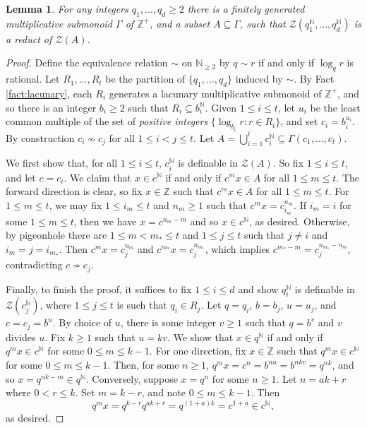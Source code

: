 \documentclass{amsart}
\def\seq{\subseteq}
\newcommand{\cZ}{\mathcal{Z}}
\def\N{\mathbb N}
\def\Z{\mathbb Z}
\newtheorem{lemma}[theorem]{Lemma}
\theoremstyle{definition}
\begin{document}
\begin{lemma}\label{lem:unary}
For any integers $q_1,\ldots,q_d\geq 2$ there is a finitely generated multiplicative submonoid $\Gamma$ of $\Z^+$, and a subset $A\seq\Gamma$, such that $\cZ(q_1^{\N},\ldots, q_d^{\N})$ is a reduct of $\cZ(A)$.
\end{lemma}
\begin{proof}
Define the equivalence relation $\sim$ on $\N_{\geq 2}$ by $q\sim r$ if and only if $\log_q r$ is rational. Let $R_1,\ldots,R_t$ be the partition of $\{q_1,\ldots,q_d\}$ induced by $\sim$. By Fact \ref{fact:lacunary},  each $R_i$ generates a lacunary multiplicative submonoid of $\Z^+$, and so there is an integer $b_i\geq 2$ such that $R_i\seq b_i^{\N}$. Given $1\leq i\leq t$, let $u_i$ be the least common multiple of the set of \emph{positive integers} $\{\log_{b_i}r:r\in R_i\}$, and set $c_i=b_i^{u_i}$. By construction $c_i\not\sim c_j$ for all $1\leq i<j\leq t$.  Let $A=\bigcup_{i=1}^t c_i^{\N}\seq\Gamma(c_1,\ldots,c_t)$. 

We first show that, for all $1\leq i\leq t$, $c_i^{\N}$ is definable in $\cZ(A)$. So fix $1\leq i\leq t$, and let  $c=c_i$. We claim that $x\in c^{\N}$ if and only if $c^mx\in A$ for all $1\leq m\leq t$. The forward direction is clear, so fix $x\in\Z$ such that $c^mx\in A$ for all $1\leq m\leq t$. For $1\leq m\leq t$, we may fix $1\leq i_m\leq t$ and $n_m\geq 1$ such that $c^mx=c_{i_m}^{n_m}$. If $i_m=i$ for some $1\leq m\leq t$, then we have $x=c^{n_m-m}$ and so $x\in c^{\N}$, as desired. Otherwise, by pigeonhole there are $1\leq m<m_*\leq t$ and $1\leq j\leq t$ such that $j\neq i$ and $i_{m}=j=i_{m_*}$. Then $c^{m}x=c_j^{n_m}$ and $c^{m_*}x=c_j^{n_{m_*}}$, which implies $c^{m_*-m}=c_j^{n_{m_*}-n_m}$, contradicting $c\not\sim c_j$. 


 

Finally, to finish the proof, it suffices to fix $1\leq i\leq d$ and show $q_i^{\N}$ is definable in $\cZ(c_j^{\N})$, where $1\leq j\leq t$ is such that $q_i\in R_j$. Let $q=q_i$, $b=b_j$, $u=u_j$, and $c=c_j=b^u$. By choice of $u$, there is some integer $v\geq 1$ such that $q=b^v$ and $v$ divides $u$. Fix $k\geq 1$ such that $u=kv$. We show that $x\in q^{\N}$ if and only if $q^mx\in c^{\N}$ for some $0\leq m\leq k-1$. For one direction, fix $x\in\Z$ such that $q^mx\in c^{\N}$ for some $0\leq m\leq k-1$. Then, for some $n\geq 1$, $q^mx=c^n=b^{nu}=b^{nkv}=q^{nk}$, and so $x=q^{nk-m}\in q^{\N}$. Conversely, suppose $x=q^n$ for some $n\geq 1$. Let $n=ak+r$ where $0<r\leq k$. Set $m=k-r$, and note $0\leq m\leq k-1$. Then
\[
q^mx=q^{k-r}q^{ak+r}=q^{(1+a)k}=c^{1+a}\in c^{\N},
\]
as desired.
\end{proof}
\end{document}
